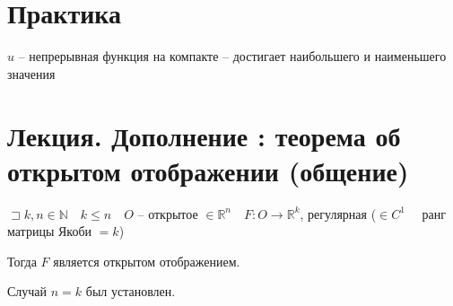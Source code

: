 \documentclass{book}
\newcommand\N{\ensuremath{\mathbb{N}}}
\newcommand\R{\ensuremath{\mathbb{R}}}
\theoremstyle{definition}
\begin{document}
\section{Практика}

$u$ -- непрерывная функция на компакте -- достигает наибольшего и наименьшего значения


\section{Лекция. Дополнение : теорема об открытом отображении (общение)}

\begin{theorem}
    $\sqsupset k, n\in \N \quad k \leqslant  n\quad O$ -- открытое $\in \R^n\quad F:O\to \R^k$, регулярная ($\in C^1\quad$ ранг матрицы Якоби  $=k$)

    Тогда  $F$ является открытом отображением.
\end{theorem}

Случай $n = k$ был установлен.
\end{document}
